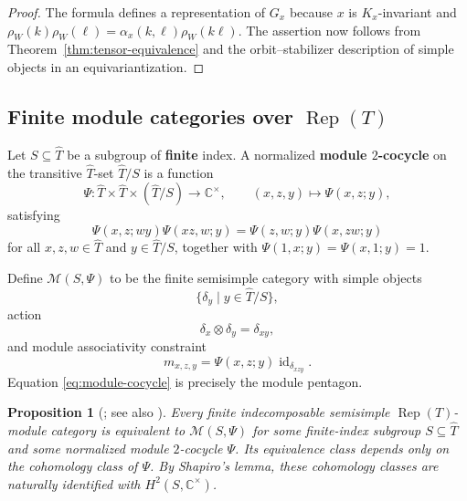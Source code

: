 \documentclass{amsart}
\newtheorem{proposition}[theorem]{Proposition}
\theoremstyle{definition}
\newcommand{\id}{\operatorname{id}}
\newcommand{\Rep}{\operatorname{Rep}}
\newcommand{\M}{\mathscr{M}}
\newcommand{\Ctimes}{\mathbb{C}^{\times}}
\numberwithin{equation}{section}
\begin{document}
\begin{proof}
The formula defines a representation of $G_x$ because $x$ is $K_x$-invariant and
$\rho_W(k)\rho_W(\ell)=\alpha_x(k,\ell)\rho_W(k\ell)$.  The assertion now follows
from Theorem~\ref{thm:tensor-equivalence} and the orbit--stabilizer description of
simple objects in an equivariantization.
\end{proof}

\subsection{\texorpdfstring{Finite module categories over $\Rep(T)$}{Finite module categories over Rep(T)}}
\label{sec:module-cats-torus}

Let $S\subseteq \widehat{T}$ be a subgroup of {\bf finite} index.  A normalized
{\bf module $2$-cocycle} on the transitive $\widehat{T}$-set $\widehat{T}/S$ is a function
\[
 \Psi:\widehat{T}\times \widehat{T}\times (\widehat{T}/S)\longrightarrow\Ctimes,
 \qquad (x,z,y)\longmapsto\Psi(x,z;y),
\]
satisfying
\begin{equation}\label{eq:module-cocycle}
 \Psi(x,z;wy)\Psi(xz,w;y)
 =\Psi(z,w;y)\Psi(x,zw;y)
\end{equation}
for all $x,z,w\in \widehat{T}$ and $y\in \widehat{T}/S$, together with
$\Psi(1,x;y)=\Psi(x,1;y)=1$.

Define $\M(S,\Psi)$ to be the finite semisimple category with simple objects
$$\{\delta_y\mid y\in \widehat{T}/S\},$$
action
\[
 \delta_x\otimes\delta_y=\delta_{xy},
\]
and module associativity constraint
\[
 m_{x,z,y}=\Psi(x,z;y)\id_{\delta_{xzy}}.
\]
Equation \eqref{eq:module-cocycle} is precisely the module pentagon.

\begin{proposition}[\cite{G2}; see also \cite{EGNO}]\label{prop:module-cats-torus}
Every finite indecomposable semisimple $\Rep(T)$-module category is equivalent to
$\M(S,\Psi)$ for some finite-index subgroup $S\subseteq \widehat{T}$ and some normalized module
$2$-cocycle $\Psi$.  Its equivalence class depends only on the cohomology class of
$\Psi$.  By Shapiro's lemma, these cohomology classes are naturally identified with
$H^2(S,\Ctimes)$.
\end{proposition}
\end{document}
